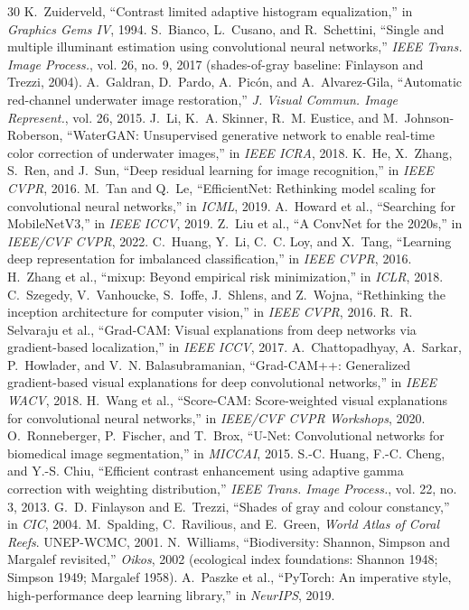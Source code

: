 \documentclass[conference]{IEEEtran}
\begin{document}
\begin{thebibliography}{30}
 K.~Zuiderveld, ``Contrast limited adaptive histogram equalization,'' in \emph{Graphics Gems IV}, 1994.
 S.~Bianco, L.~Cusano, and R.~Schettini, ``Single and multiple illuminant estimation using convolutional neural networks,'' \emph{IEEE Trans. Image Process.}, vol. 26, no. 9, 2017 (shades-of-gray baseline: Finlayson and Trezzi, 2004).
 A.~Galdran, D.~Pardo, A.~Pic\'on, and A.~Alvarez-Gila, ``Automatic red-channel underwater image restoration,'' \emph{J. Visual Commun. Image Represent.}, vol. 26, 2015.
 J.~Li, K.~A. Skinner, R.~M. Eustice, and M.~Johnson-Roberson, ``WaterGAN: Unsupervised generative network to enable real-time color correction of underwater images,'' in \emph{IEEE ICRA}, 2018.
 K.~He, X.~Zhang, S.~Ren, and J.~Sun, ``Deep residual learning for image recognition,'' in \emph{IEEE CVPR}, 2016.
 M.~Tan and Q.~Le, ``EfficientNet: Rethinking model scaling for convolutional neural networks,'' in \emph{ICML}, 2019.
 A.~Howard et al., ``Searching for MobileNetV3,'' in \emph{IEEE ICCV}, 2019.
 Z.~Liu et al., ``A ConvNet for the 2020s,'' in \emph{IEEE/CVF CVPR}, 2022.
 C.~Huang, Y.~Li, C.~C. Loy, and X.~Tang, ``Learning deep representation for imbalanced classification,'' in \emph{IEEE CVPR}, 2016.
 H.~Zhang et al., ``mixup: Beyond empirical risk minimization,'' in \emph{ICLR}, 2018.
 C.~Szegedy, V.~Vanhoucke, S.~Ioffe, J.~Shlens, and Z.~Wojna, ``Rethinking the inception architecture for computer vision,'' in \emph{IEEE CVPR}, 2016.
 R.~R. Selvaraju et al., ``Grad-CAM: Visual explanations from deep networks via gradient-based localization,'' in \emph{IEEE ICCV}, 2017.
 A.~Chattopadhyay, A.~Sarkar, P.~Howlader, and V.~N. Balasubramanian, ``Grad-CAM++: Generalized gradient-based visual explanations for deep convolutional networks,'' in \emph{IEEE WACV}, 2018.
 H.~Wang et al., ``Score-CAM: Score-weighted visual explanations for convolutional neural networks,'' in \emph{IEEE/CVF CVPR Workshops}, 2020.
 O.~Ronneberger, P.~Fischer, and T.~Brox, ``U-Net: Convolutional networks for biomedical image segmentation,'' in \emph{MICCAI}, 2015.
 S.-C. Huang, F.-C. Cheng, and Y.-S. Chiu, ``Efficient contrast enhancement using adaptive gamma correction with weighting distribution,'' \emph{IEEE Trans. Image Process.}, vol. 22, no. 3, 2013.
 G.~D. Finlayson and E.~Trezzi, ``Shades of gray and colour constancy,'' in \emph{CIC}, 2004.
 M.~Spalding, C.~Ravilious, and E.~Green, \emph{World Atlas of Coral Reefs}. UNEP-WCMC, 2001.
 N.~Williams, ``Biodiversity: Shannon, Simpson and Margalef revisited,'' \emph{Oikos}, 2002 (ecological index foundations: Shannon 1948; Simpson 1949; Margalef 1958).
 A.~Paszke et al., ``PyTorch: An imperative style, high-performance deep learning library,'' in \emph{NeurIPS}, 2019.
\end{thebibliography}
\end{document}
